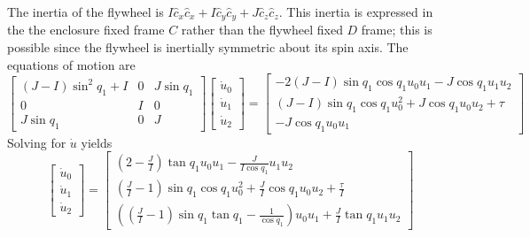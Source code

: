\documentclass[11pt,letterpaper]{article}
\begin{document}
The inertia of the flywheel is $I \hat{c}_x \hat{c}_x + I \hat{c}_y \hat{c}_y +
J \hat{c}_z \hat{c}_z$.  This inertia is expressed in the the enclosure fixed
frame $C$ rather than the flywheel fixed $D$ frame; this is possible since the
flywheel is inertially symmetric about its spin axis. The equations of motion
are
\begin{equation}
    \begin{bmatrix}
        (J - I) \sin^2 q_1 + I & 0 & J \sin q_1 \\
        0 & I & 0 \\
        J \sin q_1 & 0 & J
    \end{bmatrix}
    \begin{bmatrix}
        \dot{u}_0 \\ \dot{u}_1 \\ \dot{u}_2
    \end{bmatrix}
    =
    \begin{bmatrix}
        -2 (J - I) \sin q_1 \cos q_1 u_0 u_1  - J \cos q_1 u_1 u_2 \\
        (J - I) \sin q_1 \cos q_1 u_0^2 + J \cos q_1 u_0 u_2 + \tau \\
        -J \cos q_1 u_0 u_1
    \end{bmatrix}
\end{equation}
Solving for $\dot{u}$ yields
\begin{equation}
    \begin{bmatrix}
        \dot{u}_0 \\ \dot{u}_1 \\ \dot{u}_2
    \end{bmatrix}
    =
    \begin{bmatrix}
        (2 - \frac{J}{I}) \tan q_1 u_0 u_1 - \frac{J}{I \cos q_1} u_1 u_2 \\
        (\frac{J}{I} - 1) \sin q_1 \cos q_1 u_0^2 + \frac{J}{I} \cos q_1 u_0 u_2 + \frac{\tau}{I} \\
        \left( (\frac{J}{I} - 1) \sin q_1 \tan q_1 - \frac{1}{\cos q_1} \right) u_0 u_1 + \frac{J}{I} \tan q_1 u_1 u_2
    \end{bmatrix}
\end{equation}
\end{document}
